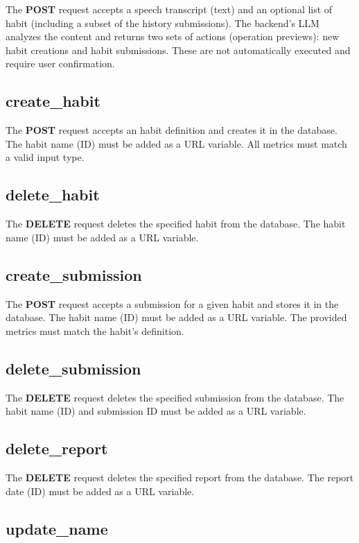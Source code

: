 \documentclass{article}
\begin{document}
The \textbf{POST} request accepts a speech transcript (text) and an optional list of habit (including a subset of the history submissions).
The backend's LLM analyzes the content and returns two sets of actions (operation previews): new habit creations and habit submissions.
These are not automatically executed and require user confirmation.

\subsection{create\_habit}

The \textbf{POST} request accepts an habit definition and creates it in the database.
The habit name (ID) must be added as a URL variable.
All metrics must match a valid input type.

\subsection{delete\_habit}

The \textbf{DELETE} request deletes the specified habit from the database.
The habit name (ID) must be added as a URL variable.

\subsection{create\_submission}

The \textbf{POST} request accepts a submission for a given habit and stores it in the database.
The habit name (ID) must be added as a URL variable.
The provided metrics must match the habit's definition.

\subsection{delete\_submission}

The \textbf{DELETE} request deletes the specified submission from the database.
The habit name (ID) and submission ID must be added as a URL variable.

\subsection{delete\_report}

The \textbf{DELETE} request deletes the specified report from the database.
The report date (ID) must be added as a URL variable.

\subsection{update\_name}
\end{document}
